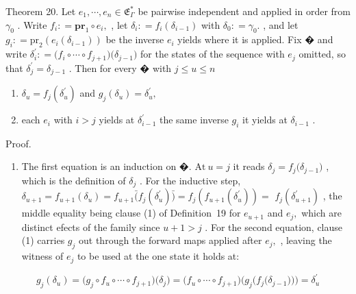 \documentclass[
  10
]{article}
\providecommand{\tightlist}{%
  \setlength{\itemsep}{0pt}\setlength{\parskip}{0pt}}
\begin{document}
Theorem 20. Let
\(e _ { 1 } , \cdots , e _ { n } \in \mathfrak { E } _ { \Gamma } ^ { * }\)
be pairwise independent and applied in order from \(\gamma _ { 0 }\) .
Write \(f _ { i } : = \mathbf { p r } _ { 1 } \circ e _ { i } ,\) , let
\(\delta _ { i } : = f _ { i } ( \delta _ { i - 1 } )\) with
\(\delta _ { 0 } : = \gamma _ { 0 } .\) , and let
\(g _ { i } : = \mathrm { p r } _ { 2 } ( e _ { i } ( \delta _ { i - 1 } ) )\)
be the inverse \(e _ { i }\) yields where it is applied. Fix � and write
\(\delta _ { i } ^ { \prime } : = \big ( f _ { i } \circ \cdots \circ f _ { j + 1 } \big ) \big ( \delta _ { j - 1 } \big )\)
for the states of the sequence with \(e _ { j }\) omitted, so that
\(\delta _ { j } ^ { \prime } = \delta _ { j - 1 }\) . Then for every �
with \(j \leq u \leq n\)

\begin{enumerate}
\def\labelenumi{\arabic{enumi}.}
\item
  \(\delta _ { u } = f _ { j } ( \delta _ { u } ^ { \prime } )\) and
  \(g _ { j } ( \delta _ { u } ) = \delta _ { u } ^ { \prime } ,\)
\item
  each \(e _ { i }\) with \(i > j\) yields at
  \(\delta _ { i - 1 } ^ { \prime }\) the same inverse \(g _ { i }\) it
  yields at \(\delta _ { i - 1 }\) .
\end{enumerate}

Proof.

\begin{enumerate}
\def\labelenumi{\arabic{enumi}.}
\tightlist
\item
  The first equation is an induction on �. \(\mathrm { A t } ~ u = j\)
  it reads
  \(\delta _ { j } = f _ { j } \big ( \delta _ { j - 1 } \big )\) ,
  which is the definition of \(\delta _ { j }\) . For the inductive
  step,
  \(\delta _ { u + 1 } = f _ { u + 1 } ( \delta _ { u } ) = f _ { u + 1 } \mathbf { \bar { ( } } f _ { j } ( \delta _ { u } ^ { \prime } ) \mathbf { \bar { ) } } = f _ { j } ( f _ { u + 1 } ( \delta _ { u } ^ { \prime } ) ) =\)
  \(f _ { j } \left( \delta _ { u + 1 } ^ { \prime } \right)\) , the
  middle equality being clause (1) of Definition~19 for
  \(e _ { u + 1 }\) and \(e _ { j } ,\) which are distinct efects of the
  family since \(u + 1 > j\) . For the second equation, clause (1)
  carries \(g _ { j }\) out through the forward maps applied after
  \(e _ { j } ,\) , leaving the witness of \(e _ { j }\) to be used at
  the one state it holds at:
\end{enumerate}

\[
g _ { j } ( \delta _ { u } ) = \bigl ( g _ { j } \circ f _ { u } \circ \cdots \circ f _ { j + 1 } \bigr ) \bigl ( \delta _ { j } \bigr ) = \bigl ( f _ { u } \circ \cdots \circ f _ { j + 1 } \bigr ) \bigl ( g _ { j } \bigl ( f _ { j } \bigl ( \delta _ { j - 1 } \bigr ) \bigr ) \bigr ) = \delta _ { u } ^ { \prime }
\]
\end{document}
